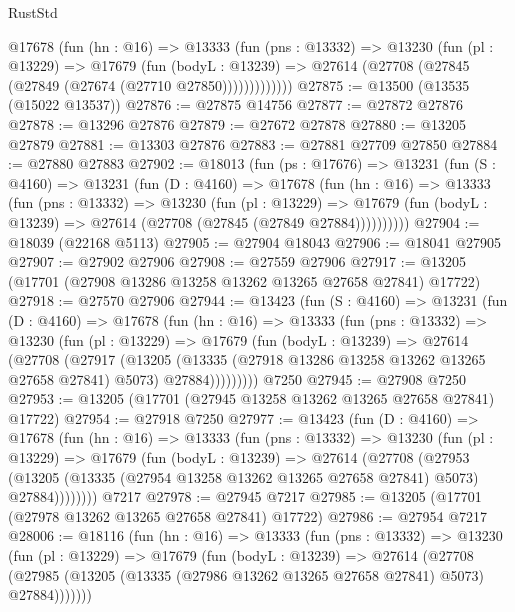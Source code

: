 \begin{lexlean}{RustStd}
\begin{coremodule}
          @17678
            (fun (hn : @16) =>
            @13333
              (fun (pns : @13332) =>
              @13230
                (fun (pl : @13229) =>
                @17679
                  (fun (bodyL : @13239) =>
                  @27614 (@27708 (@27845 (@27849 (@27674 (@27710 @27850)))))))))))))
@27875 := @13500 (@13535 (@15022 @13537))
@27876 := @27875 @14756
@27877 := @27872 @27876
@27878 := @13296 @27876
@27879 := @27672 @27878
@27880 := @13205 @27879
@27881 := @13303 @27876
@27883 := @27881 @27709 @27850
@27884 := @27880 @27883
@27902 := @18013
    (fun (ps : @17676) =>
    @13231
      (fun (S : @4160) =>
      @13231
        (fun (D : @4160) =>
        @17678
          (fun (hn : @16) =>
          @13333
            (fun (pns : @13332) =>
            @13230
              (fun (pl : @13229) =>
              @17679 (fun (bodyL : @13239) => @27614 (@27708 (@27845 (@27849 @27884))))))))))
@27904 := @18039 (@22168 @5113)
@27905 := @27904 @18043
@27906 := @18041 @27905
@27907 := @27902 @27906
@27908 := @27559 @27906
@27917 := @13205 (@17701 (@27908 @13286 @13258 @13262 @13265 @27658 @27841) @17722)
@27918 := @27570 @27906
@27944 := @13423
    (fun (S : @4160) =>
    @13231
      (fun (D : @4160) =>
      @17678
        (fun (hn : @16) =>
        @13333
          (fun (pns : @13332) =>
          @13230
            (fun (pl : @13229) =>
            @17679
              (fun (bodyL : @13239) =>
              @27614
                (@27708
                  (@27917
                    (@13205
                      (@13335 (@27918 @13286 @13258 @13262 @13265 @27658 @27841) @5073)
                      @27884)))))))))
    @7250
@27945 := @27908 @7250
@27953 := @13205 (@17701 (@27945 @13258 @13262 @13265 @27658 @27841) @17722)
@27954 := @27918 @7250
@27977 := @13423
    (fun (D : @4160) =>
    @17678
      (fun (hn : @16) =>
      @13333
        (fun (pns : @13332) =>
        @13230
          (fun (pl : @13229) =>
          @17679
            (fun (bodyL : @13239) =>
            @27614
              (@27708
                (@27953
                  (@13205 (@13335 (@27954 @13258 @13262 @13265 @27658 @27841) @5073) @27884))))))))
    @7217
@27978 := @27945 @7217
@27985 := @13205 (@17701 (@27978 @13262 @13265 @27658 @27841) @17722)
@27986 := @27954 @7217
@28006 := @18116
    (fun (hn : @16) =>
    @13333
      (fun (pns : @13332) =>
      @13230
        (fun (pl : @13229) =>
        @17679
          (fun (bodyL : @13239) =>
          @27614
            (@27708
              (@27985 (@13205 (@13335 (@27986 @13262 @13265 @27658 @27841) @5073) @27884)))))))

\end{coremodule}
\end{lexlean}
